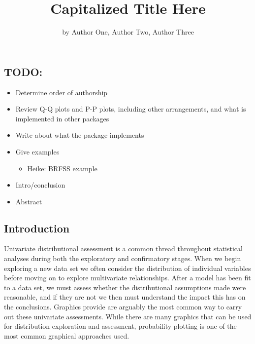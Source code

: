 \title{Capitalized Title Here}
\author{by Author One, Author Two, Author Three}

\maketitle


\subsection{TODO:}\label{todo}

\begin{itemize}
\tightlist
\item
  Determine order of authorship
\item
  Review Q-Q plots and P-P plots, including other arrangements, and what
  is implemented in other packages
\item
  Write about what the package implements
\item
  Give examples

  \begin{itemize}
  \tightlist
  \item
    Heike: BRFSS example
  \end{itemize}
\item
  Intro/conclusion
\item
  Abstract
\end{itemize}

\subsection{Introduction}\label{introduction}

Univariate distributional assessment is a common thread throughout
statistical analyses during both the exploratory and confirmatory
stages. When we begin exploring a new data set we often consider the
distribution of individual variables before moving on to explore
multivariate relationships. After a model has been fit to a data set, we
must assess whether the distributional assumptions made were reasonable,
and if they are not we then must understand the impact this has on the
conclusions. Graphics provide are arguably the most common way to carry
out these univariate assessments. While there are many graphics that can
be used for distribution exploration and assessment, probability
plotting is one of the most common graphical approaches used.

